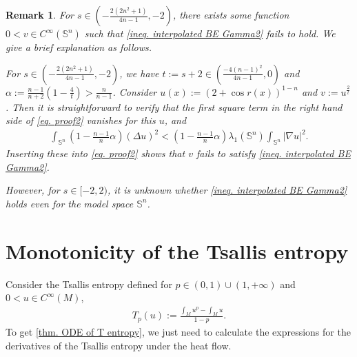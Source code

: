 \documentclass[11pt]{amsart}
\newtheorem{remark}{Remark}
\numberwithin{equation}{section}
\numberwithin{lemma}{section}
\numberwithin{proposition}{section}
\numberwithin{corollary}{section}
\numberwithin{remark}{section}
\begin{document}
\begin{remark}\label{rmk. counterexample}
     For $s\in \left(-\frac{2(2n^2+1)}{4n-1},-2\right)$, there exists some function $0<v\in C^{\infty}(\mathbb{S}^n)$ such that
    \cref{ineq. interpolated BE Gamma2} fails to hold.
    We give a brief explanation as follows.
    
    For $s\in \left(-\frac{2(2n^2+1)}{4n-1},-2\right)$, we have $t:=s+2\in \left(\frac{-4(n-1)^2}{4n-1},0\right)$ and $\alpha:=\frac{n-1}{n+2}\left(1-\frac{4}{t}\right)>\frac{n}{n-1}$. Consider $u(x):=(2+\cos r(x))^{1-n}$ and $v:=u^{\frac{2}{t}}$. Then it is straightforward to verify that the first square term in the right hand side of \cref{eq. proof2} vanishes for this $u$, and 
    \begin{align*}
        \int_{\mathbb{S}^n}
     \left(1-\frac{n-1}{n}\alpha\right)(\Delta u)^2
     <\left(1-\frac{n-1}{n}\alpha\right)\lambda_1(\mathbb{S}^n)
     \int_{\mathbb{S}^n}|\nabla u|^2.
    \end{align*}
    Inserting these into \cref{eq. proof2} shows that $v$ fails to satisfy \cref{ineq. interpolated BE Gamma2}.

    However, for $s\in[-2,2)$, it is unknown whether \cref{ineq. interpolated BE Gamma2} holds even for the model space $\mathbb{S}^n$.
 \end{remark}
\section{Monotonicity of the Tsallis entropy }\label{sec. corollaries}
Consider the Tsallis entropy defined for $p\in(0,1)\cup(1,+\infty)$ and $0<u\in C^{\infty}(M)$,
\begin{align}\label{eq. Tsallis entropy}
    T_p(u):=\frac{\int_M u^p-\int_M u}{1-p}.
\end{align}
To get \cref{thm. ODE of T entropy}, we just need to calculate the expressions for the derivatives of the Tsallis entropy under the heat flow.
\end{document}
